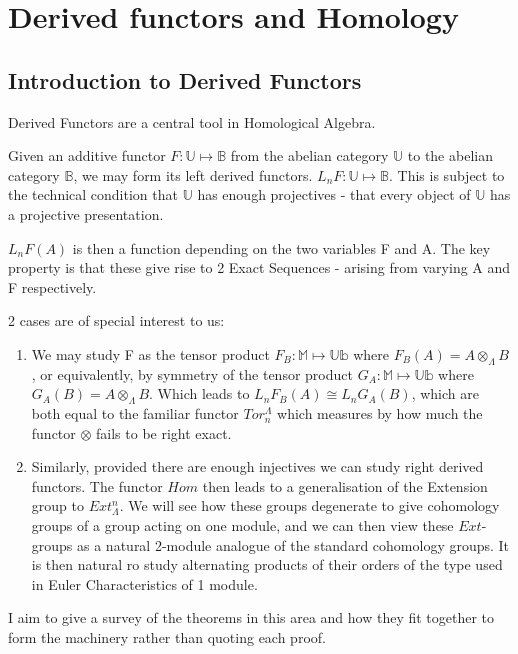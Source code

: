 \section{Derived functors and Homology}\label{df1}
\subsection{Introduction to Derived Functors}\label{df1.1}

Derived Functors are a central tool in Homological Algebra.

Given an additive functor $F:\mathbb{U} \mapsto \mathbb{B}$ from
the abelian category $\mathbb{U}$ to the abelian category
$\mathbb{B}$, we may form its left derived functors.
$L_nF:\mathbb{U} \mapsto \mathbb{B}$. This is subject to the
technical condition that $\mathbb{U}$ has enough projectives -
that every object of $\mathbb{U}$ has a projective presentation.

$L_nF(A)$ is then a function depending on the two variables F and
A. The key property is that these give rise to 2 Exact Sequences -
arising from varying A and F respectively.

2 cases are of special interest to us:
\begin{enumerate}
    \item We may study F as the tensor product $F_B: \mathbb M
    \mapsto \mathbb{Ub}$ where $F_B(A) = A\otimes_\Lambda B$, or
    equivalently, by symmetry of the tensor product $G_A: \mathbb M
    \mapsto \mathbb{Ub}$ where $G_A(B) = A\otimes_\Lambda B$.
    Which leads to $L_nF_B(A) \cong L_nG_A(B)$, which are both
    equal to the familiar functor $Tor_n^\Lambda$ which measures
    by how much the functor $\otimes$ fails to be right exact.

    \item  Similarly, provided there are enough injectives we can
    study right derived functors. The functor $Hom$ then leads to
    a generalisation of the Extension group to $Ext^n_\Lambda$. We
    will see how these groups degenerate to give cohomology groups
    of a group acting on one module, and we can then view these
    $Ext$-groups as a natural 2-module analogue of the standard
    cohomology groups. It is then natural ro study alternating
    products of their orders of the type used in Euler
    Characteristics of 1 module.
\end{enumerate}
I aim to give a survey of the theorems in this area and how they
fit together to  form the machinery rather than quoting each
proof.

